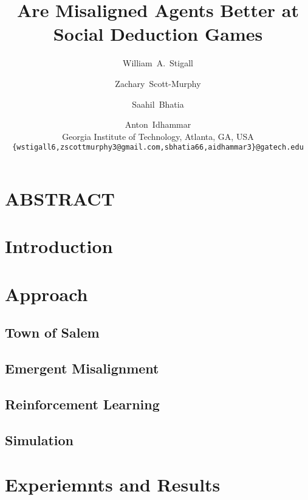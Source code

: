 \documentclass[10pt,onecolumn,letterpaper]{article}
\begin{document}
\title{Are Misaligned Agents Better at Social Deduction Games}

\author{
  William~A.~Stigall \and
  Zachary~Scott-Murphy \and
  Saahil~Bhatia \and
  Anton~Idhammar \\[0.5em]
  Georgia Institute of Technology, Atlanta, GA, USA \\[0.25em]
  {\tt\small\{wstigall6,zscottmurphy3@gmail.com,sbhatia66,aidhammar3\}@gatech.edu}
}




\maketitle


\section{ABSTRACT}
\section{Introduction}

\section{Approach}
\subsection{Town of Salem}
\subsection{Emergent Misalignment}
\subsection{Reinforcement Learning}
\subsection{Simulation}

\section{Experiemnts and Results}
\end{document}
